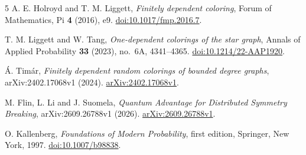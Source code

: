 \documentclass[11pt]{amsart}
\begin{document}
\begin{thebibliography}{5}
A. E. Holroyd and T. M. Liggett,
\emph{Finitely dependent coloring},
Forum of Mathematics, Pi \textbf{4} (2016), e9.
\href{https://doi.org/10.1017/fmp.2016.7}{doi:10.1017/fmp.2016.7}.

T. M. Liggett and W. Tang,
\emph{One-dependent colorings of the star graph},
Annals of Applied Probability \textbf{33} (2023), no.~6A, 4341--4365.
\href{https://doi.org/10.1214/22-AAP1920}{doi:10.1214/22-AAP1920}.

\'A. Tim\'ar,
\emph{Finitely dependent random colorings of bounded degree graphs},
arXiv:2402.17068v1 (2024).
\href{https://arxiv.org/abs/2402.17068v1}{arXiv:2402.17068v1}.

M. Flin, L. Li and J. Suomela,
\emph{Quantum Advantage for Distributed Symmetry Breaking},
arXiv:2609.26788v1 (2026).
\href{https://arxiv.org/abs/2609.26788v1}{arXiv:2609.26788v1}.

O. Kallenberg,
\emph{Foundations of Modern Probability},
first edition, Springer, New York, 1997.
\href{https://doi.org/10.1007/b98838}{doi:10.1007/b98838}.
\end{thebibliography}
\end{document}
